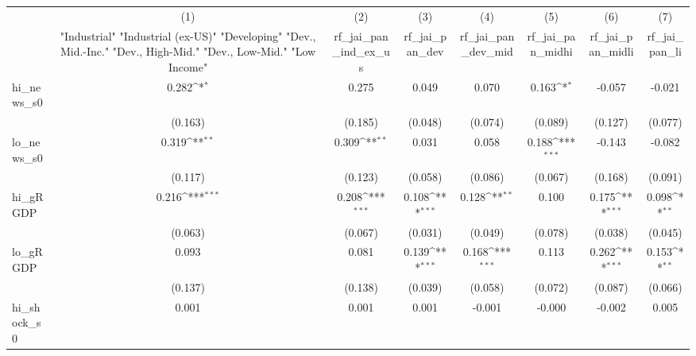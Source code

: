 {
\def\sym#1{\ifmmode^{#1}\else\(^{#1}\)\fi}
\begin{tabular}{l*{7}{c}}
\toprule
            &\multicolumn{1}{c}{(1)}&\multicolumn{1}{c}{(2)}&\multicolumn{1}{c}{(3)}&\multicolumn{1}{c}{(4)}&\multicolumn{1}{c}{(5)}&\multicolumn{1}{c}{(6)}&\multicolumn{1}{c}{(7)}\\
            &\multicolumn{1}{c}{ "Industrial" "Industrial (ex-US)" "Developing" "Dev., Mid.-Inc." "Dev., High-Mid."  "Dev., Low-Mid." "Low Income" }&\multicolumn{1}{c}{rf\_jai\_pan\_ind\_ex\_us}&\multicolumn{1}{c}{rf\_jai\_pan\_dev}&\multicolumn{1}{c}{rf\_jai\_pan\_dev\_mid}&\multicolumn{1}{c}{rf\_jai\_pan\_midhi}&\multicolumn{1}{c}{rf\_jai\_pan\_midli}&\multicolumn{1}{c}{rf\_jai\_pan\_li}\\
\midrule
hi\_news\_s0  &       0.282\sym{*}  &       0.275         &       0.049         &       0.070         &       0.163\sym{*}  &      -0.057         &      -0.021         \\
            &     (0.163)         &     (0.185)         &     (0.048)         &     (0.074)         &     (0.089)         &     (0.127)         &     (0.077)         \\
\addlinespace
lo\_news\_s0  &       0.319\sym{**} &       0.309\sym{**} &       0.031         &       0.058         &       0.188\sym{***}&      -0.143         &      -0.082         \\
            &     (0.117)         &     (0.123)         &     (0.058)         &     (0.086)         &     (0.067)         &     (0.168)         &     (0.091)         \\
\addlinespace
hi\_gRGDP    &       0.216\sym{***}&       0.208\sym{***}&       0.108\sym{***}&       0.128\sym{**} &       0.100         &       0.175\sym{***}&       0.098\sym{**} \\
            &     (0.063)         &     (0.067)         &     (0.031)         &     (0.049)         &     (0.078)         &     (0.038)         &     (0.045)         \\
\addlinespace
lo\_gRGDP    &       0.093         &       0.081         &       0.139\sym{***}&       0.168\sym{***}&       0.113         &       0.262\sym{***}&       0.153\sym{**} \\
            &     (0.137)         &     (0.138)         &     (0.039)         &     (0.058)         &     (0.072)         &     (0.087)         &     (0.066)         \\
\addlinespace
hi\_shock\_s0 &       0.001         &       0.001         &       0.001         &      -0.001         &      -0.000         &      -0.002         &       0.005         \\

\end{tabular}}
